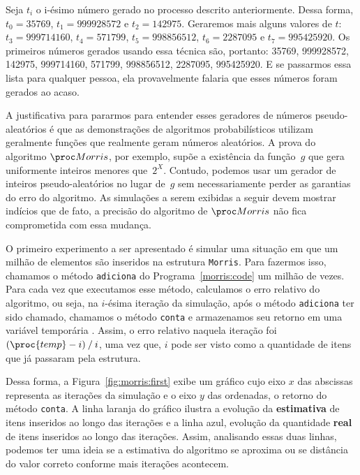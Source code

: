 Seja $t_i$ o i-ésimo número gerado no processo descrito anteriormente. Dessa forma, $t_0 = 35769$, $t_1 = 999928572$ e 
$t_2 = 142975$. Geraremos mais alguns valores de $t$: $t_3 = 999714160$, $t_4 = 571799$, $t_5 = 998856512$, 
$t_6 = 2287095$ e $t_7 = 995425920$. Os primeiros números gerados usando essa técnica são, portanto: 35769, 999928572, 
142975, 999714160, 571799, 998856512, 2287095, 995425920. E se passarmos essa lista para qualquer pessoa, ela 
provavelmente falaria que esses números foram gerados ao acaso.

A justificativa para pararmos para entender esses geradores de números pseudo-aleatórios é que as demonstrações de 
algoritmos probabilísticos utilizam geralmente funções que realmente geram números aleatórios. A prova do algoritmo 
$\Morris$, por exemplo, supõe a existência da função~$g$ que gera uniformente inteiros menores que~$2^X$. Contudo, 
podemos usar um gerador de inteiros pseudo-aleatórios no lugar de~$g$ sem necessariamente perder as garantias do erro
do algoritmo. As simulações a serem exibidas a seguir devem mostrar indícios que de fato, a precisão do algoritmo de 
$\Morris$ não fica comprometida com essa mudança.

O primeiro experimento a ser apresentado é simular uma situação em que um milhão de elementos são inseridos na estrutura 
\texttt{Morris}. Para fazermos isso, chamamos o método \texttt{adiciona} do Programa~\ref{morris:code} um milhão de 
vezes. Para cada vez que executamos esse método, calculamos o erro relativo do algoritmo, ou seja, na $i$-ésima 
iteração da simulação, após o método \texttt{adiciona} ter sido chamado, chamamos o método \texttt{conta} e armazenamos 
seu retorno em uma variável temporária . Assim, o erro relativo naquela iteração foi 
$(\proc{temp} - i) \mathbin{/} i$, uma vez que, $i$ pode ser visto como a quantidade de itens que já passaram pela 
estrutura.

Dessa forma, a Figura~\ref{fig:morris:first} exibe um gráfico cujo eixo $x$ das abscissas representa as iterações da 
simulação e o eixo $y$ das ordenadas, o retorno do método \texttt{conta}. A linha laranja do gráfico ilustra a evolução 
da \textbf{estimativa} de itens inseridos ao longo das iterações e a linha azul, evolução da quantidade \textbf{real} de 
itens inseridos ao longo das iterações. Assim, analisando essas duas linhas, podemos ter uma ideia se a estimativa do 
algoritmo se aproxima ou se distância do valor correto conforme mais iterações acontecem.

